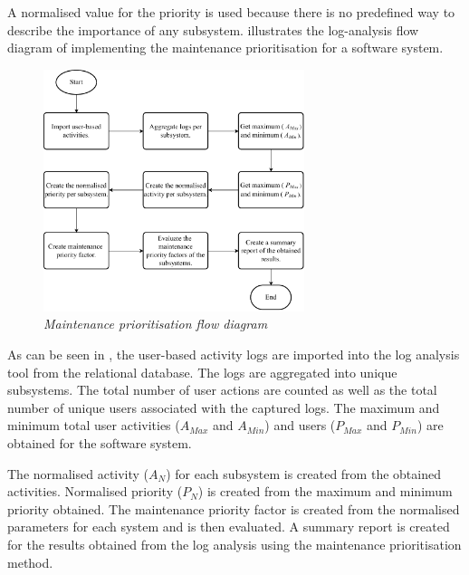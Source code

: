 \clearpage

A normalised value for the priority is used because there is no predefined way to describe the importance of any subsystem.  illustrates the log-analysis flow diagram of implementing the maintenance prioritisation for a software system. 

\begin{figure}[!htb]
	\centering
	\includegraphics[width=0.68\textwidth]{img/Chapter2/maintenancePriortisation/maintenancePriortisation.pdf}
	\caption[Maintenance prioritisation flow diagram]
	{\textit{Maintenance prioritisation flow diagram}}\label{fig:ch2_maintenancePriortisationFlow}
\end{figure}

As can be seen in , the user-based activity logs are imported into the log analysis tool from the relational database. The logs are aggregated into unique subsystems. The total number of user actions are counted as well as the total number of unique users associated with the captured logs. The maximum and minimum total user activities ($A_{Max}$ and $A_{Min}$) and users ($P_{Max}$ and $P_{Min}$) are obtained for the software system. \par The normalised activity ($A_N$) for each subsystem is created from the obtained activities. Normalised priority ($P_N$) is created from the maximum and minimum priority obtained. The maintenance priority factor is created from the normalised parameters for each system and is then evaluated. A summary report is created for the results obtained from the log analysis using the maintenance prioritisation method.

\clearpage


